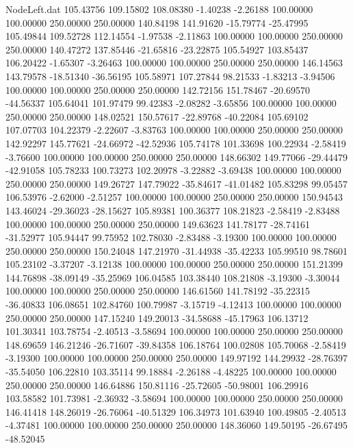 \begin{filecontents}{NodeLeft.dat}
 105.43756  109.15802  108.08380    -1.40238   -2.26188  100.00000  100.00000  250.00000  250.00000  140.84198  141.91620  -15.79774  -25.47995
 105.49844  109.52728  112.14554    -1.97538   -2.11863  100.00000  100.00000  250.00000  250.00000  140.47272  137.85446  -21.65816  -23.22875
 105.54927  103.85437  106.20422    -1.65307   -3.26463  100.00000  100.00000  250.00000  250.00000  146.14563  143.79578  -18.51340  -36.56195
 105.58971  107.27844   98.21533    -1.83213   -3.94506  100.00000  100.00000  250.00000  250.00000  142.72156  151.78467  -20.69570  -44.56337
 105.64041  101.97479   99.42383    -2.08282   -3.65856  100.00000  100.00000  250.00000  250.00000  148.02521  150.57617  -22.89768  -40.22084
 105.69102  107.07703  104.22379    -2.22607   -3.83763  100.00000  100.00000  250.00000  250.00000  142.92297  145.77621  -24.66972  -42.52936
 105.74178  101.33698  100.22934    -2.58419   -3.76600  100.00000  100.00000  250.00000  250.00000  148.66302  149.77066  -29.44479  -42.91058
 105.78233  100.73273  102.20978    -3.22882   -3.69438  100.00000  100.00000  250.00000  250.00000  149.26727  147.79022  -35.84617  -41.01482
 105.83298   99.05457  106.53976    -2.62000   -2.51257  100.00000  100.00000  250.00000  250.00000  150.94543  143.46024  -29.36023  -28.15627
 105.89381  100.36377  108.21823    -2.58419   -2.83488  100.00000  100.00000  250.00000  250.00000  149.63623  141.78177  -28.74161  -31.52977
 105.94447   99.75952  102.78030    -2.83488   -3.19300  100.00000  100.00000  250.00000  250.00000  150.24048  147.21970  -31.44938  -35.42233
 105.99510   98.78601  105.23102    -3.37207   -3.12138  100.00000  100.00000  250.00000  250.00000  151.21399  144.76898  -38.09149  -35.25969
 106.04585  103.38440  108.21808    -3.19300   -3.30044  100.00000  100.00000  250.00000  250.00000  146.61560  141.78192  -35.22315  -36.40833
 106.08651  102.84760  100.79987    -3.15719   -4.12413  100.00000  100.00000  250.00000  250.00000  147.15240  149.20013  -34.58688  -45.17963
 106.13712  101.30341  103.78754    -2.40513   -3.58694  100.00000  100.00000  250.00000  250.00000  148.69659  146.21246  -26.71607  -39.84358
 106.18764  100.02808  105.70068    -2.58419   -3.19300  100.00000  100.00000  250.00000  250.00000  149.97192  144.29932  -28.76397  -35.54050
 106.22810  103.35114   99.18884    -2.26188   -4.48225  100.00000  100.00000  250.00000  250.00000  146.64886  150.81116  -25.72605  -50.98001
 106.29916  103.58582  101.73981    -2.36932   -3.58694  100.00000  100.00000  250.00000  250.00000  146.41418  148.26019  -26.76064  -40.51329
 106.34973  101.63940  100.49805    -2.40513   -4.37481  100.00000  100.00000  250.00000  250.00000  148.36060  149.50195  -26.67495  -48.52045

\end{filecontents}
